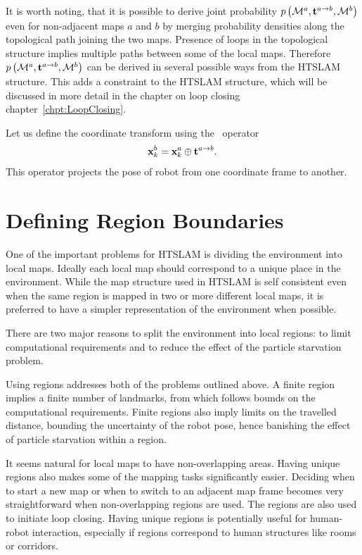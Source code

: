 It is worth noting, that it is possible to derive joint
probability $\prob{\map{}{}{a},\tr{}{a}{b},\map{}{}{b}}$ even for
non-adjacent maps $a$ and $b$ by merging probability densities along
the topological path joining the two maps.  Presence of loops in
the topological structure implies multiple paths between some of the
local maps. Therefore $\prob{\map{}{}{a},\tr{}{a}{b},\map{}{}{b}}$ can
be derived in several possible ways from the HTSLAM structure. This
adds a constraint to the HTSLAM structure, which will be discussed in
more detail in the chapter on loop closing chapter~\ref{chpt:LoopClosing}.

Let us define the coordinate transform using the \transit\ operator
\begin{equation}
\x{k}{}{b} = \x{k}{}{a} \transit \tr{}{a}{b}.
\end{equation}
This operator projects the pose of robot from one coordinate frame to
another.


\section{Defining Region Boundaries}
\label{sec:region}

One of the important problems for HTSLAM is dividing the environment
into local maps. Ideally each local map should correspond to a unique
place in the environment. While the map structure used in HTSLAM is
self consistent even when the same region is mapped in two or more
different local maps, it is preferred to have a simpler representation
of the environment when possible.

There are two major reasons to split the environment into local
regions: to limit computational requirements and to reduce the effect
of the particle starvation problem.

Using regions addresses both of the problems outlined above. A finite
region implies a finite number of landmarks, from which follows bounds
on the computational requirements. Finite regions also imply limits on
the travelled distance, bounding the uncertainty of the robot pose,
hence banishing the effect of particle starvation within a region.

It seems natural for local maps to have non-overlapping areas. Having
unique regions also makes some of the mapping tasks significantly
easier. Deciding when to start a new map or when to switch to an
adjacent map frame becomes very straightforward when non-overlapping
regions are used. The regions are also used to initiate loop
closing. Having unique regions is potentially useful for human-robot
interaction, especially if regions correspond to human structures
like rooms or corridors.

